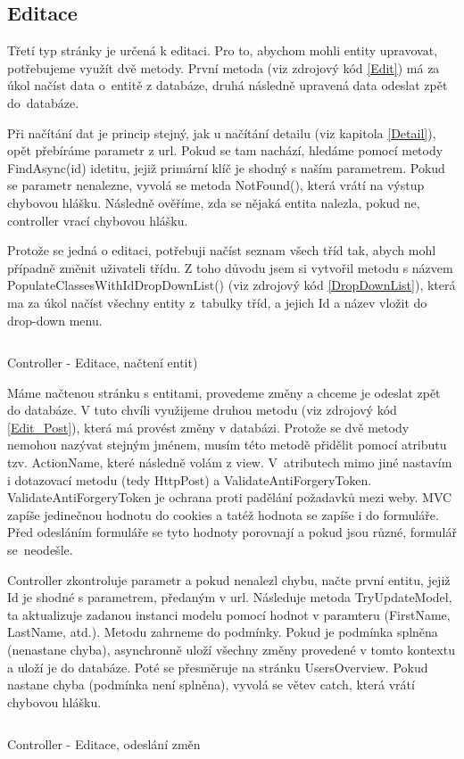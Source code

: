\documentclass[a4paper, 12pt]{report}
\begin{document}
	\subsection{Editace}
	Třetí typ stránky je určená k editaci. Pro to, abychom mohli entity upravovat, potřebujeme využít dvě metody. První metoda (viz zdrojový kód \ref{Edit}) má za úkol načíst data o~entitě z databáze, druhá následně upravená data odeslat zpět do~databáze.\par
	Při načítání dat je princip stejný, jak u načítání detailu (viz kapitola \ref{Detail}), opět přebíráme parametr z url. Pokud se tam nachází, hledáme pomocí metody FindAsync(id) idetitu, jejiž primární klíč je shodný s naším parametrem. Pokud se parametr nenalezne, vyvolá se metoda NotFound(), která vrátí na výstup chybovou hlášku. Následně ověříme, zda se nějaká entita nalezla, pokud ne, controller vrací chybovou hlášku.\par
	Protože se jedná o editaci, potřebuji načíst seznam všech tříd tak, abych mohl případně změnit uživateli třídu. Z toho důvodu jsem si vytvořil metodu s názvem PopulateClassesWithIdDropDownList() (viz zdrojový kód \ref{DropDownList}), která ma za úkol načíst všechny entity z~tabulky tříd, a jejich Id a název vložit do drop-down menu.
	\begin{listing}[H]
	\inputminted{csharp}{SourceCode/Controllers/Edit.cs}
	\caption{Controller - Editace, načtení entit)}
	\label{Edit}
	\end{listing}
	Máme načtenou stránku s entitami, provedeme změny a chceme je odeslat zpět do databáze. V tuto chvíli využijeme druhou metodu (viz zdrojový kód \ref{Edit_Post}), která má provést změny v databázi. Protože se dvě metody nemohou nazývat stejným jménem, musím této metodě přidělit pomocí atributu tzv. ActionName, které následně volám z view. V~atributech mimo jiné nastavím i dotazovací metodu (tedy HttpPost) a ValidateAntiForgeryToken. ValidateAntiForgeryToken je ochrana proti padělání požadavků mezi weby. MVC zapíše jedinečnou hodnotu do cookies a tatéž hodnota se zapíše i do formuláře. Před odesláním formuláře se tyto hodnoty porovnají a pokud jsou různé, formulář se~neodešle.\par
	Controller zkontroluje parametr a pokud nenalezl chybu, načte první entitu, jejiž Id je shodné s parametrem, předaným v url. Následuje metoda TryUpdateModel, ta aktualizuje zadanou instanci modelu pomocí hodnot v paramteru (FirstName, LastName, atd.). Metodu zahrneme do podmínky. Pokud je podmínka splněna (nenastane chyba), asynchronně uloží všechny změny provedené v tomto kontextu a uloží je do databáze. Poté se přesměruje na stránku UsersOverview. Pokud nastane chyba (podmínka není splněna), vyvolá se větev catch, která vrátí chybovou hlášku.
	\begin{listing}[H]
		\inputminted{csharp}{SourceCode/Controllers/Edit_Post.cs}
		\caption{Controller - Editace, odeslání změn}
		\label{Edit_Post}
	\end{listing}
\end{document}
